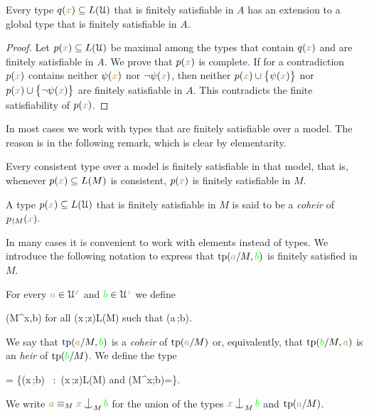 \begin{proposition}\label{prop_exisntence_coheirs}
  Every type $q({\color{brown} x})\subseteq L(\EuScript U)$ that is finitely satisfiable in $A$ has an extension to a global type that is finitely satisfiable in $A$.
\end{proposition}

\begin{proof}
  Let $p({\color{brown} x})\subseteq L(\EuScript U)$ be maximal among the types that contain $q({\color{brown} x})$ and are finitely satisfiable in $A$.
  We prove that $p({\color{brown} x})$ is complete.
  If for a contradiction $p({\color{brown} x})$ contains neither $\psi({\color{brown} x})$ nor $\neg\psi({\color{brown} x})$, then  neither $p({\color{brown} x})\cup\big\{\psi({\color{brown} x})\big\}$ nor $p({\color{brown} x})\cup\big\{\neg\psi({\color{brown} x})\big\}$ are finitely satisfiable in $A$.
  This contradicts the finite satisfiability of $p({\color{brown} x})$.
\end{proof}

In most cases we work with types that are finitely satisfiable over a model.
The reason is in the following remark, which is clear by elementarity.

\begin{remark}\label{rk_coher_over_model}
  Every consistent type over a model is finitely satisfiable in that model, that is, whenever $p({\color{brown} x})\subseteq L(M)$ is consistent, $p({\color{brown} x})$ is finitely satisfiable in $M$.
\end{remark}

\begin{definition}\label{def_choeir_uno}
  A type $p({\color{brown} x})\subseteq L(\EuScript U)$ that is finitely satisfiable in $M$ is said to be a \emph{coheir\/} of $p_{\restriction M}({\color{brown} x})$.
\end{definition}

In many cases it is convenient to work with elements instead of types.
We introduce the following notation to express that ${\rm tp}({\color{brown} a}/M,{\color{green} b})$ is finitely satisfied in $M$.

\begin{definition}\label{def_coheir_idepencence}
  For every ${\color{brown} a}\in\EuScript U^{\color{brown} x}$ and ${\color{green} b}\in\EuScript U^{\color{green} z}$ we define\smallskip

  {\IFF}
  {\phi(M^{\mr x},{\gr b})\neq\varnothing
  \textrm{ for all }\phi({\mr x}\,;{\gr z})\in L(M) 
  \textrm{ such that }\phi({\mr a}\,;{\gr b})}.\smallskip

  We say that ${\rm tp}({\color{brown} a}/M,{\color{green} b})$ is a \emph{coheir} of ${\rm tp}({\color{brown} a}/M)$ or, equivalently, that ${\rm tp}({\color{green} b}/M,{\color{brown} a})$ is an \emph{heir} of ${\rm tp}({\color{green} b}/M)$.
  We define the type\smallskip

  {=}
  {\Big\{\neg\phi({\mr x}\,;{\gr b})
  \ :\ 
  \phi({\mr x}\,;{\gr z})\in L(M)
  \textrm{ and } \phi(M^{\mr x};{\gr b})=\varnothing\Big\}.}\smallskip

  We write \emph{${\mr a}\equiv_M{\mr x}\nonfork_M{\gr b}$} for the union of the types ${\mr x}\nonfork_M{\gr b}$ and ${\rm tp}({\color{brown} a}/M)$.
\end{definition}

